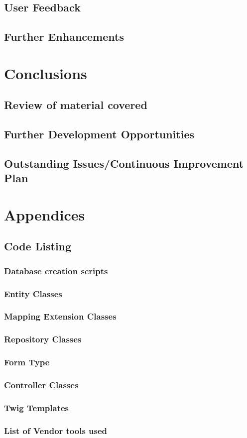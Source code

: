 \documentclass[a4paper,Times New Roman 11pt]{article}
\begin{document}
\subsection {User Feedback}
\subsection {Further Enhancements}
\section {Conclusions}
\subsection {Review of material covered }
\subsection {Further Development Opportunities}
\subsection {Outstanding Issues/Continuous Improvement Plan}


\section {Appendices}
\subsection {Code Listing}

\subsubsection {Database creation scripts}
\subsubsection {Entity Classes}
\subsubsection {Mapping Extension Classes}
\subsubsection {Repository Classes}
\subsubsection {Form Type}
\subsubsection {Controller Classes}
\subsubsection {Twig Templates}
\subsubsection {List of Vendor tools used}
\newpage\printbibliography[title={Bibliography}]
\end{document}
